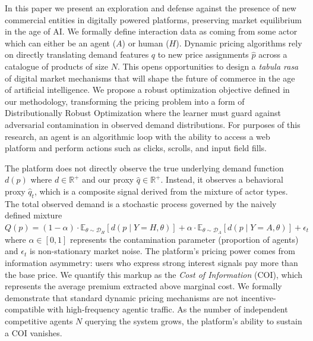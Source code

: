 \documentclass[10pt,letterpaper]{article}
\begin{document}
\vspace{0.5em}
In this paper we present an exploration and defense against the presence of new commercial entities in digitally powered platforms, preserving market equilibrium in the age of AI.
We formally define interaction data as coming from some actor which can either be an agent ($A$) or human ($H$).
Dynamic pricing algorithms rely on directly translating demand features $q$ to new price assignments $\hat{p}$ across a catalogue of products of size $N$.
This opens opportunities to design a \textit{tabula rasa} of digital market mechanisms that will shape the future of commerce in the age of artificial intelligence.
We propose a robust optimization objective defined in our methodology, transforming the pricing problem into a form of Distributionally Robust Optimization \parencite{kuhn_distributionally_2025} where the learner must guard against adversarial contamination in observed demand distributions.
For purposes of this research, an agent is an algorithmic loop with the ability to access a web platform and perform actions such as clicks, scrolls, and input field fills.

\vspace{0.5em}
The platform does not directly observe the true underlying demand function $d(p)$ where $d \in \mathbb{R}^{+}$ and our proxy $\hat{q} \in \mathbb{R}^{+}$.
Instead, it observes a behavioral proxy $\hat{q}_t$, which is a composite signal derived from the mixture of actor types.
The total observed demand is a stochastic process governed by the naively defined mixture $Q(p) = (1-\alpha) \cdot \mathbb{E}_{\theta \sim \mathcal{D}_H}[d(p\mid Y=H,\theta)] + \alpha \cdot \mathbb{E}_{\theta \sim \mathcal{D}_A}[d(p\mid Y=A,\theta)] + \epsilon_t$ where $\alpha \in [0, 1]$ represents the contamination parameter (proportion of agents) and $\epsilon_t$ is non-stationary market noise.
The platform's pricing power comes from information asymmetry: users who express strong interest signals pay more than the base price.
We quantify this markup as the \textit{Cost of Information} (COI), which represents the average premium extracted above marginal cost.
We formally demonstrate that standard dynamic pricing mechanisms are not incentive-compatible with high-frequency agentic traffic.
As the number of independent competitive agents $N$ querying the system grows, the platform's ability to sustain a COI vanishes.
\end{document}
